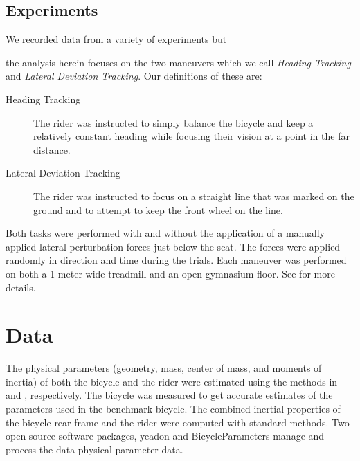 \documentclass[a4paper]{article}
\begin{document}

\subsection{Experiments}
We recorded data from a variety of experiments \cite{Moore2012} but %

the analysis herein focuses on the two maneuvers which we call \emph{Heading
Tracking} and \emph{Lateral Deviation Tracking}. Our definitions of these are:

\begin{description}
  \item[Heading Tracking]
    The rider was instructed to simply balance the bicycle and keep a
    relatively constant heading while focusing their vision at a point in the
    far distance.
  \item[Lateral Deviation Tracking]
    The rider was instructed to focus on a straight line that was marked on the
    ground and to attempt to keep the front wheel on the line.
\end{description}

Both tasks were performed with and without the application of a manually
applied lateral perturbation forces just below the seat. The forces were
applied randomly in direction and time during the trials. Each maneuver was
performed on both a 1 meter wide treadmill and an open gymnasium floor. See
\cite{Moore2012} for more details.

\section{Data}

The physical parameters (geometry, mass, center of mass, and moments of
inertia) of both the bicycle and the rider were estimated using the methods in
\cite{Moore2012} and \cite{Yeadon1990}, respectively. The bicycle was measured
to get accurate estimates of the parameters used in the benchmark bicycle. The
combined inertial properties of the bicycle rear frame and the rider were
computed with standard methods. Two open source software packages, yeadon
\cite{Dembia2011} and BicycleParameters \cite{Moore2011} manage and process the
data physical parameter data.
\end{document}
